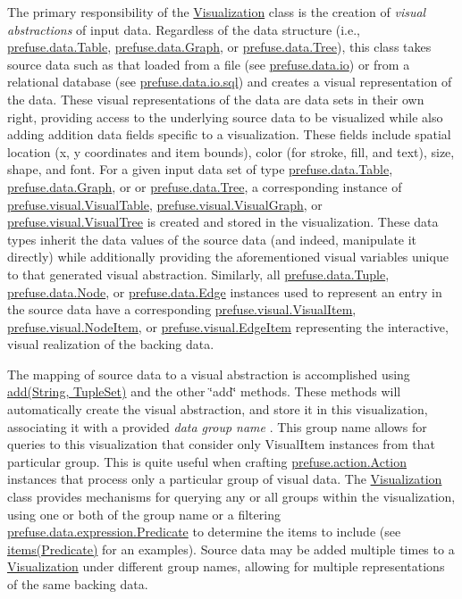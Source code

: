 \-The primary responsibility of the \hyperlink{classprefuse_1_1_visualization}{\-Visualization} class is the creation of {\itshape visual abstractions\/} of input data. \-Regardless of the data structure (i.\-e., \hyperlink{}{prefuse.\-data.\-Table}, \hyperlink{}{prefuse.\-data.\-Graph}, or \hyperlink{}{prefuse.\-data.\-Tree}), this class takes source data such as that loaded from a file (see \hyperlink{}{prefuse.\-data.\-io}) or from a relational database (see \hyperlink{}{prefuse.\-data.\-io.\-sql}) and creates a visual representation of the data. \-These visual representations of the data are data sets in their own right, providing access to the underlying source data to be visualized while also adding addition data fields specific to a visualization. \-These fields include spatial location (x, y coordinates and item bounds), color (for stroke, fill, and text), size, shape, and font. \-For a given input data set of type \hyperlink{}{prefuse.\-data.\-Table}, \hyperlink{}{prefuse.\-data.\-Graph}, or or \hyperlink{}{prefuse.\-data.\-Tree}, a corresponding instance of \hyperlink{}{prefuse.\-visual.\-Visual\-Table}, \hyperlink{}{prefuse.\-visual.\-Visual\-Graph}, or \hyperlink{}{prefuse.\-visual.\-Visual\-Tree} is created and stored in the visualization. \-These data types inherit the data values of the source data (and indeed, manipulate it directly) while additionally providing the aforementioned visual variables unique to that generated visual abstraction. \-Similarly, all \hyperlink{}{prefuse.\-data.\-Tuple}, \hyperlink{}{prefuse.\-data.\-Node}, or \hyperlink{}{prefuse.\-data.\-Edge} instances used to represent an entry in the source data have a corresponding \hyperlink{}{prefuse.\-visual.\-Visual\-Item}, \hyperlink{}{prefuse.\-visual.\-Node\-Item}, or \hyperlink{}{prefuse.\-visual.\-Edge\-Item} representing the interactive, visual realization of the backing data.

\-The mapping of source data to a visual abstraction is accomplished using \hyperlink{classprefuse_1_1_visualization_ab79414b5d699750a30741cb66c2bde97}{add(\-String, Tuple\-Set)} and the other \char`\"{}add\char`\"{} methods. \-These methods will automatically create the visual abstraction, and store it in this visualization, associating it with a provided {\itshape data group name \/}. \-This group name allows for queries to this visualization that consider only \-Visual\-Item instances from that particular group. \-This is quite useful when crafting \hyperlink{}{prefuse.\-action.\-Action} instances that process only a particular group of visual data. \-The \hyperlink{classprefuse_1_1_visualization}{\-Visualization} class provides mechanisms for querying any or all groups within the visualization, using one or both of the group name or a filtering \hyperlink{}{prefuse.\-data.\-expression.\-Predicate} to determine the items to include (see \hyperlink{classprefuse_1_1_visualization_a6c3b3afd67dbfbb043cd88bbd381455c}{items(\-Predicate)} for an examples). \-Source data may be added multiple times to a \hyperlink{classprefuse_1_1_visualization}{\-Visualization} under different group names, allowing for multiple representations of the same backing data.

